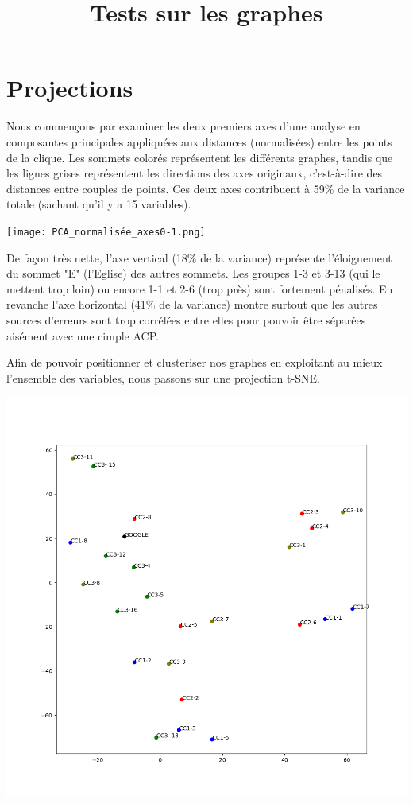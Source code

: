 \documentclass[a4paper]{article}
\title{Tests sur les graphes}
\author{}
\date{}
\begin{document}
\section{Projections}

Nous commençons par examiner les deux premiers axes d'une analyse en composantes principales appliquées aux distances (normalisées) entre les points de la clique. Les sommets colorés représentent les différents graphes, tandis que les lignes grises représentent les directions des axes originaux, c'est-à-dire des distances entre couples de points. Ces deux axes contribuent à 59\% de la variance totale (sachant qu'il y a 15 variables).

\texttt{[image: PCA\_normalisée\_axes0-1.png]}

De façon très nette, l'axe vertical (18\% de la variance) représente l'éloignement du sommet "E" (l'Eglise) des autres sommets. Les groupes 1-3 et 3-13 (qui le mettent trop loin) ou encore 1-1 et 2-6 (trop près) sont fortement pénalisés. En revanche l'axe horizontal (41\% de la variance) montre surtout que les autres sources d'erreurs sont trop corrélées entre elles pour pouvoir être séparées aisément avec une cimple ACP.

Afin de pouvoir positionner et clusteriser nos graphes en exploitant au mieux l'ensemble des variables, nous passons sur une projection t-SNE.

\includegraphics[scale=0.6]{TSNE_normalisé.png}
\end{document}
